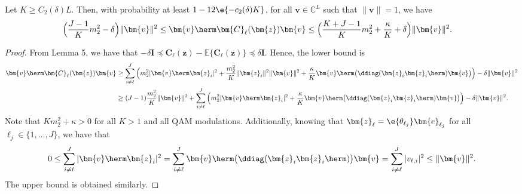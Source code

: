 \begin{cor} \label{cor:c_quad_form} 
Let $K\geq C_2(\delta)L$. Then, with probability at least $1-12\e{-c_2(\delta)K}$, for all $\bm{v}\in\mathbb{C}^{L}$ such that $\|\bm{v}\|=1$, we have
\begin{align}
	&\Big(\frac{J-1}{K}m_2^2-\delta\Big)\|\bm{v}\|^2
	\leq\bm{v}\herm\bm{C}_{\ell}(\bm{z})\bm{v}
	\leq\Big(\frac{K+J-1}{K}m_2^2 +\frac{\kappa}{K} +  \delta\Big)\|\bm{v}\|^2\nonumber. %
\end{align}	
\end{cor}
\begin{proof}
From Lemma 5, we have that $-\delta\bm{I}\preceq\bm{C}_{\ell}(\bm{z})-\mathbb{E}\{\bm{C}_{\ell}(\bm{z})\}\preceq\delta\bm{I}$. Hence, the lower bound is
\begin{align}
	\bm{v}\herm\bm{C}_{\ell}(\bm{z})\bm{v}&\geq
	\sum_{i\neq {\ell}}^J\Big(m_2^2|\bm{v}\herm\bm{z}_i|^2 +\frac{m_2^2}{K}  \|\bm{z}_i\|^2\|\bm{v}\|^2+ \frac{\kappa}{K}  \bm{v}\herm\big(\ddiag(\bm{z}_i\bm{z}_i\herm)\bm{v}\big)\Big) - \delta\|\bm{v}\|^2\nonumber\\
	&\geq
	(J-1)\frac{m_2^2}{K}\|\bm{v}\|^2 +
	\sum_{i\neq {\ell}}^J\Big(m_2^2|\bm{v}\herm\bm{z}_i|^2+ \frac{\kappa}{K}  \bm{v}\herm\big(\ddiag(\bm{z}_i\bm{z}_i\herm)\bm{v}\big)\Big) - \delta\|\bm{v}\|^2. \nonumber%
\end{align}
Note that $Km_2^2+\kappa>0$ for all $K>1$ and all QAM modulations. Additionally, knowing that $\bm{z}_{\ell}=\e{\theta_{\ell_j}}\bm{e}_{\ell_j}$ for all ${\ell}_j\in\{1,\ldots,J\}$, we have that
\begin{align}
	0\leq\sum_{i\neq {\ell}}^J|\bm{v}\herm\bm{z}_i|^2=
	\sum_{i\neq {\ell}}^J \bm{v}\herm\big(\ddiag(\bm{z}_i\bm{z}_i\herm)\big)\bm{v}=\sum_{i\neq {\ell}}^J |v_{\ell,i}|^2\leq\|\bm{v}\|^2.\nonumber
\end{align}
The upper bound is obtained similarly.
\end{proof}
